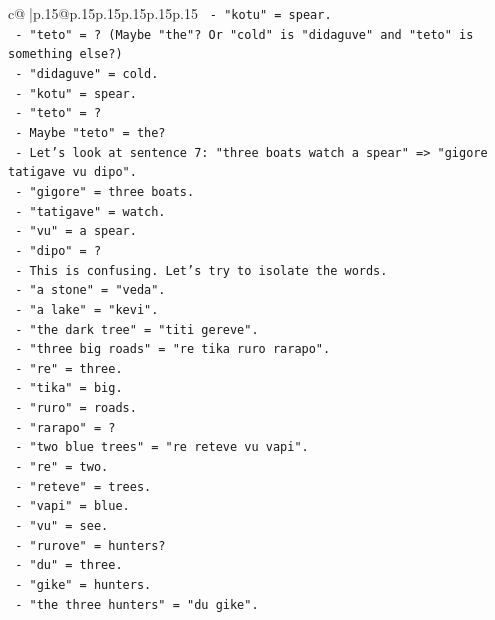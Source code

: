 \documentclass{article}
\begin{document}
{\begin{supertabular}{c@{$\;$}|p{.15\linewidth}@{}p{.15\linewidth}p{.15\linewidth}p{.15\linewidth}p{.15\linewidth}p{.15\linewidth}}
{{{\texttt{         {-} "kotu" = spear.} \\
\texttt{         {-} "teto" = ? (Maybe "the"? Or "cold" is "didaguve" and "teto" is something else?)} \\
\texttt{         {-} "didaguve" = cold.} \\
\texttt{         {-} "kotu" = spear.} \\
\texttt{         {-} "teto" = ?} \\
\texttt{         {-} Maybe "teto" = the?} \\
\texttt{       {-} Let's look at sentence 7: "three boats watch a spear" => "gigore tatigave vu dipo".} \\
\texttt{         {-} "gigore" = three boats.} \\
\texttt{         {-} "tatigave" = watch.} \\
\texttt{         {-} "vu" = a spear.} \\
\texttt{         {-} "dipo" = ?} \\
\texttt{         {-} This is confusing. Let's try to isolate the words.} \\
\texttt{         {-} "a stone" = "veda".} \\
\texttt{         {-} "a lake" = "kevi".} \\
\texttt{         {-} "the dark tree" = "titi gereve".} \\
\texttt{         {-} "three big roads" = "re tika ruro rarapo".} \\
\texttt{           {-} "re" = three.} \\
\texttt{           {-} "tika" = big.} \\
\texttt{           {-} "ruro" = roads.} \\
\texttt{           {-} "rarapo" = ?} \\
\texttt{         {-} "two blue trees" = "re reteve vu vapi".} \\
\texttt{           {-} "re" = two.} \\
\texttt{           {-} "reteve" = trees.} \\
\texttt{           {-} "vapi" = blue.} \\
\texttt{           {-} "vu" = see.} \\
\texttt{           {-} "rurove" = hunters?} \\
\texttt{           {-} "du" = three.} \\
\texttt{           {-} "gike" = hunters.} \\
\texttt{           {-} "the three hunters" = "du gike".} \\
}}}
\end{supertabular}}
\end{document}

